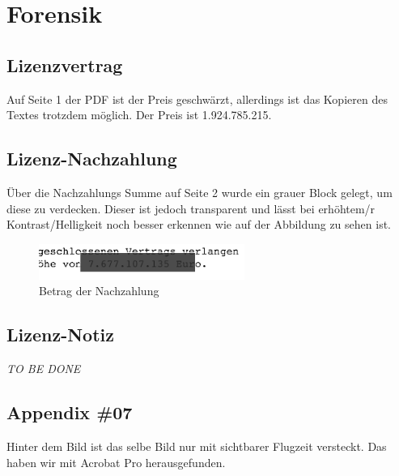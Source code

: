 \documentclass[12pt,a4paper,titlepage,oneside]{scrartcl}
\begin{document}
\maketitle
\setcounter{section}{0}
\setcounter{tocdepth}{2}
\tableofcontents

%
%

\section{Forensik}

\subsection{Lizenzvertrag}
Auf Seite 1 der PDF ist der Preis geschwärzt, allerdings ist das Kopieren des Textes trotzdem möglich. Der Preis ist 1.924.785.215.



\subsection{Lizenz-Nachzahlung}

Über die Nachzahlungs Summe auf Seite 2 wurde ein grauer Block gelegt, um diese zu verdecken.
Dieser ist jedoch transparent und lässt bei erhöhtem/r Kontrast/Helligkeit noch besser erkennen
 wie auf der Abbildung zu sehen ist.

\begin{figure}[h!]
  \centering
    \includegraphics[width=0.6\textwidth]{./imgs/Forensik/Lizenz_Nachzahlung.png}
  \caption{Betrag der Nachzahlung}
  \label{fig:allvoipcalls}
\end{figure}


\subsection{Lizenz-Notiz}
\emph{TO BE DONE}

\subsection{Appendix \#07}
Hinter dem Bild ist das selbe Bild nur mit sichtbarer Flugzeit versteckt. Das haben wir mit Acrobat Pro herausgefunden.
\end{document}
